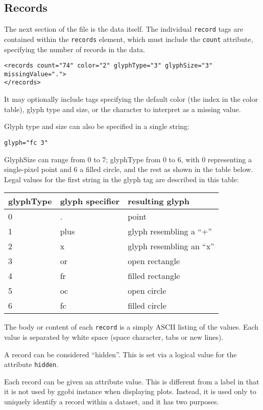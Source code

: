 \documentclass{article}
\def\XMLAttribute#1{\Escape{#1}}
\begin{document}
\subsection{Records}

The next section of the file is the data itself.  The individual
\texttt{record} tags are contained within the \texttt{records}
element, which must include the \texttt{count} attribute, specifying
the number of records in the data.

\begin{verbatim}
<records count="74" color="2" glyphType="3" glyphSize="3" missingValue=".">
</records>
\end{verbatim}
%
It may optionally include tags specifying the default color (the
index in the color table), glyph type and size, or the character to
interpret as a missing value.

Glyph type and size can also be specified in a single string:
\begin{verbatim}
glyph="fc 3"
\end{verbatim}
GlyphSize can range from 0 to 7; glyphType from 0 to 6, with 0
representing a single-pixel point and 6 a filled circle, and
the rest as shown in the table below.  Legal values
for the first string in the glyph tag are described in this table:

\begin{tabular}{l|l|l}
glyphType & glyph specifier & resulting glyph \\
\hline
0 & .    & point \\
1 & plus & glyph resembling a ``+'' \\
2 & x    & glyph resembling an ``x'' \\
3 & or   & open rectangle \\
4 & fr   & filled rectangle \\
5 & oc   & open circle \\
6 & fc   & filled circle
\end{tabular}

The body or content of each \texttt{record} is a simply ASCII listing
of the values. Each value is separated by white space (space
character, tabs or new lines).

A record can be considered ``hidden''.  This is set via a logical
value for the attribute \texttt{hidden}.

Each record can be given an \XMLAttribute{id} attribute value.  This
is different from a label in that it is not used by ggobi instance
when displaying plots.  Instead, it is used only to uniquely identify
a record within a dataset, and it has two purposes.
\end{document}
